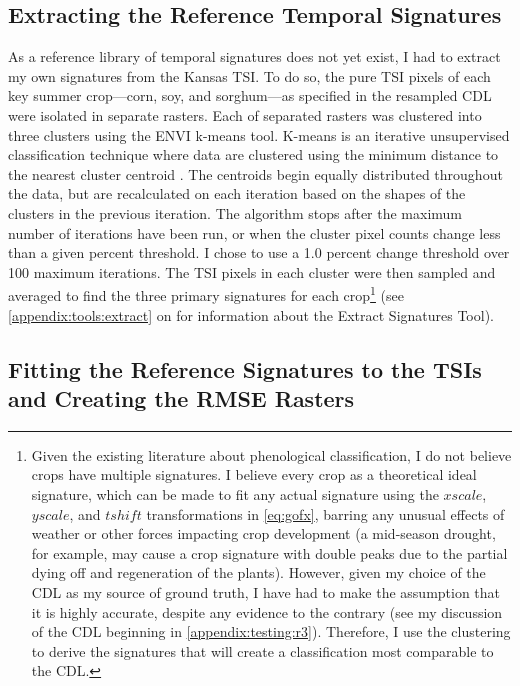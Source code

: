 \subsection{Extracting the Reference Temporal Signatures}

As a reference library of temporal signatures does not yet exist, I had to extract my own signatures from the Kansas TSI. To do so, the pure TSI pixels of each key summer crop---corn, soy, and sorghum---as specified in the resampled CDL were isolated in separate rasters. Each of separated rasters was clustered into three clusters using the ENVI \autocite{envi5.0} k-means tool. K-means is an iterative unsupervised classification technique where data are clustered using the minimum distance to the nearest cluster centroid \autocites{kmeans2014}{matteucciclustering:}. The centroids begin equally distributed throughout the data, but are recalculated on each iteration based on the shapes of the clusters in the previous iteration. The algorithm stops after the maximum number of iterations have been run, or when the cluster pixel counts change less than a given percent threshold. I chose to use a 1.0 percent change threshold over 100 maximum iterations. The TSI pixels in each cluster were then sampled and averaged to find the three primary signatures for each crop\footnote{Given the existing literature about phenological classification, I do not believe crops have multiple signatures. I believe every crop as a theoretical ideal signature, which can be made to fit any actual signature using the $xscale$, $yscale$, and $tshift$ transformations in \autoref{eq:gofx}, barring any unusual effects of weather or other forces impacting crop development (a mid-season drought, for example, may cause a crop signature with double peaks due to the partial dying off and regeneration of the plants). However, given my choice of the CDL as my source of ground truth, I have had to make the assumption that it is highly accurate, despite any evidence to the contrary (see my discussion of the CDL beginning in \autoref{appendix:testing:r3}). Therefore, I use the clustering to derive the signatures that will create a classification most comparable to the CDL.} (see \autoref{appendix:tools:extract} on  for information about the Extract Signatures Tool).


\subsection{Fitting the Reference Signatures to the TSIs and Creating the RMSE Rasters}

